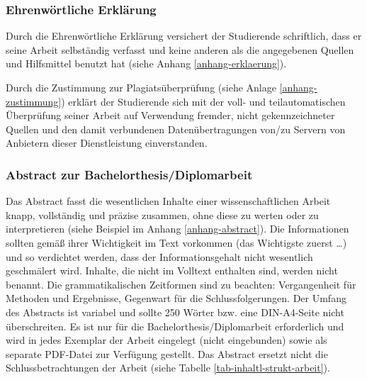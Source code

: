 \subsubsection{Ehrenwörtliche Erklärung}
\label{formal-gestaltung-anhaenge-erklaerung}
Durch die Ehrenwörtliche Erklärung versichert der Studierende schriftlich, dass er seine Arbeit selbständig verfasst und keine anderen als die angegebenen Quellen und Hilfsmittel benutzt hat (siehe Anhang \ref{anhang-erklaerung}).

Durch die Zustimmung zur Plagiatsüberprüfung (siehe Anlage \ref{anhang-zustimmung}) erklärt der Studierende sich mit der voll- und teilautomatischen Überprüfung seiner Arbeit auf Verwendung fremder, nicht gekennzeichneter Quellen und den damit verbundenen Datenübertragungen von/zu Servern von Anbietern dieser Dienstleistung einverstanden.

\subsubsection{Abstract zur Bachelorthesis/Diplomarbeit}
\label{formal-gestaltung-anhaenge-abstract}
Das Abstract fasst die wesentlichen Inhalte einer wissenschaftlichen Arbeit knapp, vollständig und präzise zusammen, ohne diese zu werten oder zu interpretieren (siehe Beispiel im Anhang \ref{anhang-abstract}).
Die Informationen sollten gemäß ihrer Wichtigkeit im Text vorkommen (das Wichtigste zuerst …) und so verdichtet werden, dass der Informationsgehalt nicht wesentlich geschmälert wird.
Inhalte, die nicht im Volltext enthalten sind, werden nicht benannt.
Die grammatikalischen Zeitformen sind zu beachten: Vergangenheit für Methoden und Ergebnisse, Gegenwart für die Schlussfolgerungen.
Der Umfang des Abstracts ist variabel und sollte 250 Wörter bzw. eine DIN-A4-Seite nicht überschreiten.
Es ist nur für die Bachelorthesis/Diplomarbeit erforderlich und wird in jedes Exemplar der Arbeit eingelegt (nicht eingebunden) sowie als separate \ac{PDF}-Datei zur Verfügung gestellt. %
Das Abstract ersetzt nicht die Schlussbetrachtungen der Arbeit (siehe Tabelle \ref{tab-inhaltl-strukt-arbeit}).
